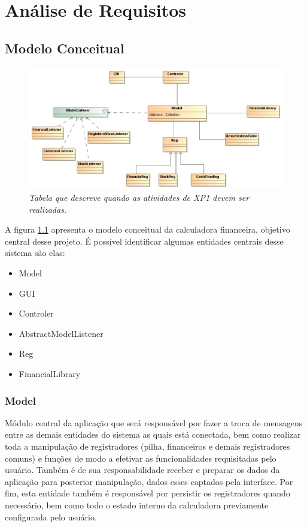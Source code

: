 \chapter{Análise de Requisitos}

\section{Modelo Conceitual}


\begin{figure}[!h]
 \includegraphics[scale=0.5]{CalcDC.eps}
 \caption{\it Tabela que descreve quando as atividades de XP1 devem ser realizadas.} \label{tab:modeConc}
\end{figure}

A figura \ref{tab:modeConc} apresenta o modelo conceitual da calculadora financeira, objetivo central desse projeto. É possível identificar algumas entidades centrais desse sistema são elas:

\begin{itemize}
	\item Model
	\item GUI
	\item Controler
	\item AbstractModelListener
	\item Reg
	\item FinancialLibrary
\end{itemize}

\subsection{Model}
Módulo central da aplicação que será responsável por fazer a troca de mensagens entre as demais entidades do sistema as quais está conectada, bem como realizar toda a manipulação de registradores (pilha, financeiros e demais registradores comuns) e funções de modo a efetivar as funcionalidades requisitadas pelo usuário. Também é de sua responsabilidade receber e preparar os dados da aplicação para posterior manipulação, dados esses captados pela interface. Por fim, esta entidade também é responsável por persistir os registradores quando necessário, bem como todo o estado interno da calculadora previamente configurada pelo usuário.

